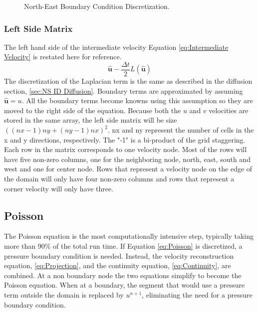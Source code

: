 \documentclass[onehalf,11pt]{beavtex}
\begin{document}
\begin{figure}[!htb]
	\centering
	
	\caption{North-East Boundary Condition Discretization.}
	\label{fig:ID iv bc}
\end{figure}

\subsubsection{Left Side Matrix}
\label{sec:ID NS lhs}
The left hand side of the intermediate velocity Equation \eqref{eq:Intermediate Velocity} is restated here for reference.
\begin{equation}
\hat{\textbf{u}} - \frac{\Delta t}{2}L(\hat{\textbf{u}})
\end{equation}
The discretization of the Laplacian term is the same as described in the diffusion section, \ref{sec:NS ID Diffusion}. 
Boundary terms are approximated by assuming $\hat{\textbf{u}}=u$. 
All the boundary terms become knowns using this assumption so they are moved to the right side of the equation. 
Because both the $u$ and $v$ velocities are stored in the same array, the left side matrix will be size $\left((nx-1)ny + (ny-1)nx\right)^2$. 
nx and ny represent the number of cells in the x and y directions, respectively.
The "-1" is a bi-product of the grid staggering. 
Each row in the matrix corresponds to one velocity node. 
Most of the rows will have five non-zero columns, one for the neighboring node, north, east, south and west and one for center node. 
Rows that represent a velocity node on the edge of the domain will only have four non-zero columns and rows that represent a corner velocity will only have three. 

\subsection{Poisson}
\label{sec:ID NS poisson}
The Poisson equation is the most computationally intensive step, typically taking more than 90\% of the total run time.
If Equation \eqref{eq:Poisson} is discretized, a pressure boundary condition is needed.
Instead, the velocity reconstruction equation, \eqref{eq:Projection}, and the continuity equation, \eqref{eq:Continuity}, are combined.
At a non boundary node the two equations simplify to become the Poisson equation.
When at a boundary, the segment that would use a pressure term outside the domain is replaced by $u^{n+1}$, eliminating the need for a pressure boundary condition.
\end{document}

